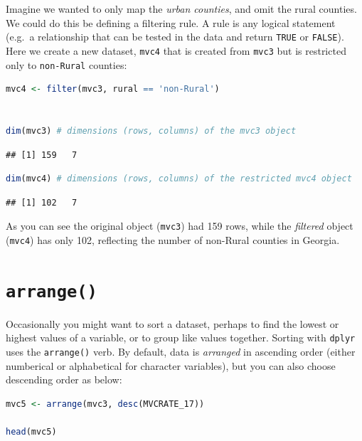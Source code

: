\documentclass[
]{book}
\newcommand{\passthrough}[1]{#1}
\begin{document}
Imagine we wanted to only map the \emph{urban counties}, and omit the rural counties. We could do this be defining a filtering rule. A rule is any logical statement (e.g.~a relationship that can be tested in the data and return \passthrough{\lstinline!TRUE!} or \passthrough{\lstinline!FALSE!}). Here we create a new dataset, \passthrough{\lstinline!mvc4!} that is created from \passthrough{\lstinline!mvc3!} but is restricted only to \passthrough{\lstinline!non-Rural!} counties:

\begin{lstlisting}[language=R]
mvc4 <- filter(mvc3, rural == 'non-Rural')


dim(mvc3) # dimensions (rows, columns) of the mvc3 object
\end{lstlisting}

\begin{lstlisting}
## [1] 159   7
\end{lstlisting}

\begin{lstlisting}[language=R]
dim(mvc4) # dimensions (rows, columns) of the restricted mvc4 object
\end{lstlisting}

\begin{lstlisting}
## [1] 102   7
\end{lstlisting}

As you can see the original object (\passthrough{\lstinline!mvc3!}) had 159 rows, while the \emph{filtered} object (\passthrough{\lstinline!mvc4!}) has only 102, reflecting the number of non-Rural counties in Georgia.

\hypertarget{arrange}{%
\section{\texorpdfstring{\texttt{arrange()}}{arrange()}}\label{arrange}}

Occasionally you might want to sort a dataset, perhaps to find the lowest or highest values of a variable, or to group like values together. Sorting with \passthrough{\lstinline!dplyr!} uses the \passthrough{\lstinline!arrange()!} verb. By default, data is \emph{arranged} in ascending order (either numberical or alphabetical for character variables), but you can also choose descending order as below:

\begin{lstlisting}[language=R]
mvc5 <- arrange(mvc3, desc(MVCRATE_17))

head(mvc5)
\end{lstlisting}
\end{document}
